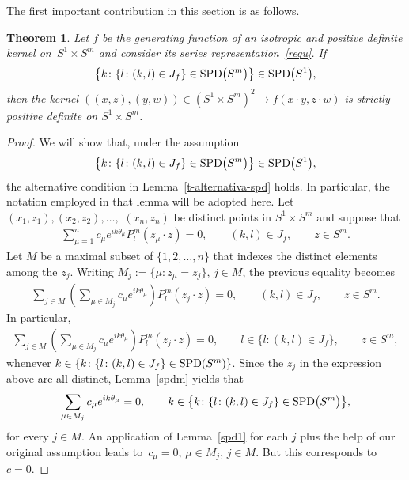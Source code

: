 \documentclass[pdftex]{sigma}
\numberwithin{equation}{section}
\newtheorem{Theorem}{Theorem}[section]
\def\t{\theta}
\begin{document}
The f\/irst important contribution in this section is as follows.

\begin{Theorem}\label{ana1}
Let $f$ be the generating function of an isotropic and positive definite kernel on~\mbox{$S^1 \times S^m$} and consider its series representation~\eqref{requ}. If
\begin{gather*}
\big\{k \colon \{l \colon (k,l)\in J_f\}\in {\rm SPD}\big(S^m\big)\big\}\in {\rm SPD}\big(S^1\big),
\end{gather*}
then the kernel $((x,z), (y,w)) \in (S^1 \times S^m)^2 \to f(x \cdot y, z \cdot w)$ is strictly positive definite on $S^1\times S^m$.
\end{Theorem}

\begin{proof} We will show that, under the assumption \begin{gather*}
\big\{k \colon \{l \colon (k,l)\in J_f\}\in {\rm SPD}\big(S^m\big)\big\}\in {\rm SPD}\big(S^1\big),\end{gather*} the alternative condition in Lemma~\ref{t-alternativa-spd} holds. In particular, the notation employed in that lemma will be adopted here. Let $(x_1,z_1),(x_2,z_2), \ldots,$ $(x_n,z_n)$ be distinct points in $S^1\times S^{m}$ and suppose that
\begin{gather*}
\sum_{\mu=1}^n c_\mu e^{ik\t_\mu} P_l^m(z_\mu\cdot z)=0, \qquad (k,l)\in J_f, \qquad z\in S^m.
\end{gather*}
Let $M$ be a maximal subset of $\{1,2,\ldots,n\}$ that indexes the distinct elements among the $z_j$. Writing $M_j:=\{\mu\colon z_\mu=z_j\}$, $j \in M$, the previous equality becomes
\begin{gather*}
\sum_{j\in M} \left(\sum_{\mu\in M_j} c_\mu e^{ik\t_\mu} \right) P_l^m(z_j\cdot z)=0, \qquad (k,l)\in J_f, \qquad z\in S^m.
\end{gather*}In particular,
\begin{gather*}
\sum_{j\in M} \left(\sum_{\mu\in M_j} c_\mu e^{ik\t_\mu} \right) P_l^m(z_j\cdot z)=0, \qquad l\in \{l\colon (k,l)\in J_f\}, \qquad z\in S^m,
\end{gather*}
whenever $k\in\{k\colon \{l\colon (k,l)\in J_f\} \in {\rm SPD}(S^m)\}$. Since the $z_j$ in the expression above are all distinct, Lemma~\ref{spdm} yields that
\begin{gather*}
\sum_{\mu\in M_j} c_\mu e^{ik\t_\mu}=0, \qquad k \in \big\{k\colon \{l\colon (k,l)\in J_f\} \in {\rm SPD}\big(S^m\big)\big\},
\end{gather*}
for every $j\in M$. An application of Lemma~\ref{spd1} for each $j$ plus the help of our original assumption leads to~$c_\mu=0$, $\mu\in M_j$, $j\in M$. But this corresponds to $c=0$.
\end{proof}
\end{document}
